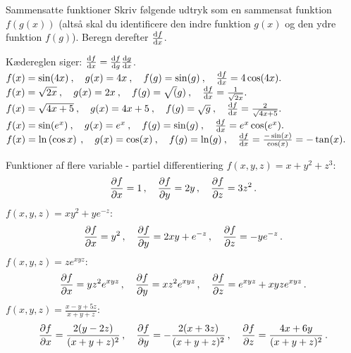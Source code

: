 \begin{opgave}[2]{Sammensatte funktioner}
Skriv følgende udtryk som en sammensat funktion $f(g(x))$ (altså skal du identificere den indre funktion $g(x)$ og den ydre funktion $f(g)$). Beregn derefter $\dv{f}{x}$.

Kædereglen siger: $\dv{f}{x}=\dv{f}{g}\dv{g}{x}$.
\opg $f(x) = \sin (4x)\:,~~~g(x)=4x\:,~~~f(g)=\sin(g)\:,~~~\dv{f}{x}=4\cos(4x).$
\opg $f(x) = \sqrt{2x}\:,~~~g(x)=2x\:,~~~f(g)=\sqrt(g)\:,~~~\dv{f}{x}=\frac{1}{\sqrt{2x}}.$
\opg $f(x) = \sqrt{4x+5}\:,~~~g(x)=4x+5\:,~~~f(g)=\sqrt{g}\:,~~~\dv{f}{x}=\frac{2}{\sqrt{4x+5}}.$
\opg $f(x) = \sin(e^x)\:,~~~g(x)=e^x\:,~~~f(g)=\sin(g)\:,~~~\dv{f}{x}=e^x\cos(e^x).$
\opg $f(x) =  \ln \left( \cos x \right)\:,~~~g(x)=\cos(x)\:,~~~f(g)=\ln(g)\:,~~~\dv{f}{x}=\frac{-\sin(x)}{\cos(x)}=-\tan(x).$
\end{opgave}
\begin{opgave}[3]{Funktioner af flere variable - partiel differentiering}
	\opg $f(x,y,z) = x+y^2+z^3$:
	\begin{align*}
	\pdv{f}{x} = 1 \, , \quad
	\pdv{f}{y} = 2y \, , \quad
	\pdv{f}{z} = 3z^2 \, .
	\end{align*}
	\opg $f(x,y,z)=xy^2+ye^{-z}$:
	\begin{align*}
	\pdv{f}{x} = y^2 \, , \quad
	\pdv{f}{y} = 2xy+e^{-z} \, , \quad
	\pdv{f}{z} = -ye^{-z} \, .
	\end{align*}
	\opg $f(x,y,z)=ze^{xyz}$:
	\begin{align*}
	\pdv{f}{x} = yz^2e^{xyz} \, , \quad
	\pdv{f}{y} = xz^2e^{xyz} \, , \quad
	\pdv{f}{z} = e^{xyz}+xyze^{xyz} \, .
	\end{align*}
	\opg $f(x,y,z) = \frac{x-y+5z}{x+y+z}$:
	\begin{align*}
	\pdv{f}{x} = \frac{2(y-2z)}{(x+y+z)^2} \, , \quad
	\pdv{f}{y} = -\frac{2(x+3z)}{(x+y+z)^2} \, , \quad
	\pdv{f}{z} = \frac{4x+6y}{(x+y+z)^2} \, .
	\end{align*}
\end{opgave}
